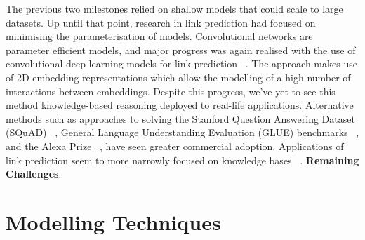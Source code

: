 The previous two milestones relied on shallow models that could scale to large datasets. Up until that point, research in link prediction had focused on minimising the parameterisation of models. Convolutional networks are parameter efficient models, and major progress was again realised with the use of convolutional deep learning models for link prediction ~\citep{dettmers2018convolutional}. The approach makes use of 2D embedding representations which allow the modelling of a high number of interactions between embeddings. \newline 
Despite this progress, we've yet to see this method knowledge-based reasoning deployed to real-life applications. Alternative methods such as approaches to solving the Stanford Question Answering Dataset (SQuAD) ~\citep{rajpurkar2016squad}, General Language Understanding Evaluation (GLUE) benchmarks ~\citep{liu2019roberta}, and the Alexa Prize ~\citep{ram2018conversational}, have seen greater commercial adoption. Applications of link prediction seem to more narrowly focused on knowledge bases ~\citep{messina2017biograkn}.  \newline
\textbf{Remaining Challenges}. 

\nomenclature[g-p]{$\pi$}{ $\simeq 3.14\ldots$}                                             %



\section{Modelling Techniques} %

